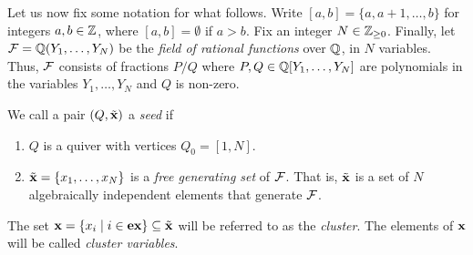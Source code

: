 Let us now fix some notation for what follows. Write $[a,b] = \{a, a + 1, \dots, b\}$
for integers $a,b \in \mathbb{Z}$, where $[a,b] = \emptyset$ if $a > b$. Fix an integer $N
	\in \mathbb{Z}_{\geq 0}$. Finally, let $\mathcal{F} = \mathbb{Q} (Y_1, \dots, Y_N)$ be the \emph{field of
	rational functions} over $\mathbb{Q}$, in $N$ variables. Thus,
$\mathcal{F}$ consists of fractions $P/Q$ where $P, Q\in \mathbb{Q}[Y_1, \dots, Y_N]$ are
polynomials in the variables $Y_1, \dots, Y_N$ and $Q$ is non-zero.

\begin{definition}
	We call a pair $(Q, \tilde{\mathbf{x}})$ a \emph{seed} if
	\begin{enumerate}
		\item $Q$ is a quiver with vertices $Q_0 = [1, N]$.
		\item $\tilde{\mathbf{x}} = \{x_1, \dots, x_N\}$ is a \emph{free generating set} of $\mathcal{F}$. That is, $\tilde{\mathbf{x}}$ is a set of $N$ algebraically independent elements that generate $\mathcal{F}$.
	\end{enumerate}
	The set $\mathbf{x} = \{x_i \mid i \in \mathbf{ex}\} \subseteq \tilde{\mathbf{x}}$ will be referred to as the \emph{cluster}. The elements of $\mathbf{x}$ will be called \emph{cluster variables}.
\end{definition}

